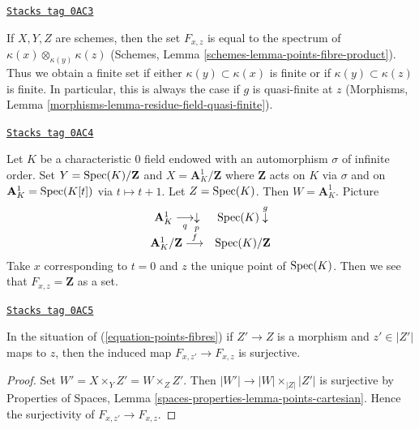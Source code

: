 \begin{example}[Schemes]
\label{decent-spaces-example-schemes}
\href{https://stacks.math.columbia.edu/tag/0AC3}{\texttt{Stacks tag 0AC3}}

If $X, Y, Z$ are schemes, then the set $F_{x, z}$
is equal to the spectrum of $\kappa(x) \otimes_{\kappa(y)} \kappa(z)$
(Schemes, Lemma \ref{schemes-lemma-points-fibre-product}). Thus we
obtain a finite set if either $\kappa(y) \subset \kappa(x)$ is finite or if
$\kappa(y) \subset \kappa(z)$ is finite. In particular, this is always
the case if $g$ is quasi-finite at $z$ (Morphisms, Lemma
\ref{morphisms-lemma-residue-field-quasi-finite}).
\end{example}

\begin{example}
\label{decent-spaces-example-not-finite}
\href{https://stacks.math.columbia.edu/tag/0AC4}{\texttt{Stacks tag 0AC4}}

Let $K$ be a characteristic $0$ field endowed with an automorphism
$\sigma$ of infinite order. Set $Y = \operatorname{Spec}(K)/\mathbf{Z}$ and
$X = \mathbf{A}^1_K/\mathbf{Z}$ where $\mathbf{Z}$ acts on $K$ via $\sigma$
and on $\mathbf{A}^1_K = \operatorname{Spec}(K[t])$ via $t \mapsto t + 1$.
Let $Z = \operatorname{Spec}(K)$. Then $W = \mathbf{A}^1_K$. Picture
$$
\begin{array}{cc}\mathbf{A}^1_K \underset{q}{\longrightarrow}\underset{p}{\downarrow} & \operatorname{Spec}(K) \overset{g}{\downarrow} \\ \mathbf{A}^1_K/\mathbf{Z} \overset{f}{\longrightarrow} & \operatorname{Spec}(K)/\mathbf{Z}\end{array}
$$
Take $x$ corresponding to $t = 0$ and $z$ the unique point of $\operatorname{Spec}(K)$.
Then we see that $F_{x, z} = \mathbf{Z}$ as a set.
\end{example}

\begin{lemma}
\label{decent-spaces-lemma-surjective-on-fibres}
\href{https://stacks.math.columbia.edu/tag/0AC5}{\texttt{Stacks tag 0AC5}}

In the situation of (\ref{equation-points-fibres}) if $Z' \to Z$
is a morphism and $z' \in |Z'|$ maps to $z$, then the induced map
$F_{x, z'} \to F_{x, z}$ is surjective.
\end{lemma}

\begin{proof}
Set $W' = X \times_Y Z' = W \times_Z Z'$. Then
$|W'| \to |W| \times_{|Z|} |Z'|$ is surjective by
Properties of Spaces, Lemma \ref{spaces-properties-lemma-points-cartesian}.
Hence the surjectivity of $F_{x, z'} \to F_{x, z}$.
\end{proof}

